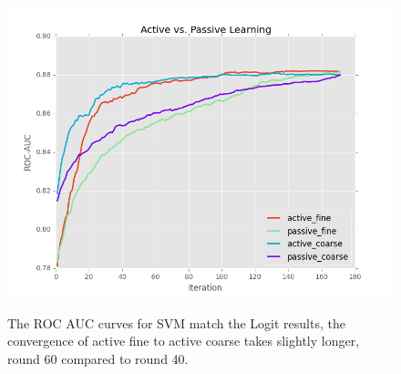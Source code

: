 \documentclass[ms]{nuthesis}
\begin{document}
\FloatBarrier
\begin{figure}[!htb]
	\centering
    \includegraphics[width=1.0\columnwidth]{fig/runActPassSVM_roc}
    \label{fig:ActiveVsPassiveROCSVM}
    \caption{The ROC AUC curves for SVM match the Logit results, the convergence of
     active fine to active coarse takes slightly longer, round 60 compared to round 40.}
\end{figure}
\FloatBarrier


%


\clearpage
\end{document}
